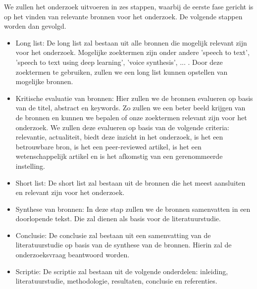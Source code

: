 We zullen het onderzoek uitvoeren in zes stappen, waarbij de eerste fase gericht is op het vinden van relevante bronnen voor het onderzoek. De volgende stappen worden dan gevolgd.
\begin{itemize}
    \item Long list: De long list zal bestaan uit alle bronnen die mogelijk relevant zijn voor het onderzoek. Mogelijke zoektermen zijn onder andere 'speech to text', 'speech to text using deep learning', 'voice synthesis', ... . Door deze zoektermen te gebruiken, zullen we een long list kunnen opstellen van mogelijke bronnen.
    \item Kritische evaluatie van bronnen: Hier zullen we de bronnen evalueren op basis van de titel, abstract en keywords. Zo zullen we een beter beeld krijgen van de bronnen en kunnen we bepalen of onze zoektermen relevant zijn voor het onderzoek. We zullen deze evalueren op basis van de volgende criteria: relevantie, actualiteit, biedt deze inzicht in het onderzoek, is het een betrouwbare bron, is het een peer-reviewed artikel, is het een wetenschappelijk artikel en is het afkomstig van een gerenommeerde instelling.
    \item Short list: De short list zal bestaan uit de bronnen die het meest aansluiten en relevant zijn voor het onderzoek.
    \item Synthese van bronnen: In deze stap zullen we de bronnen samenvatten in een doorlopende tekst. Die zal dienen als basis voor de literatuurstudie.
    \item Conclusie: De conclusie zal bestaan uit een samenvatting van de literatuurstudie op basis van de synthese van de bronnen. Hierin zal de onderzoeksvraag beantwoord worden.
    \item Scriptie: De scriptie zal bestaan uit de volgende onderdelen: inleiding, literatuurstudie, methodologie, resultaten, conclusie en referenties.
\end{itemize}

